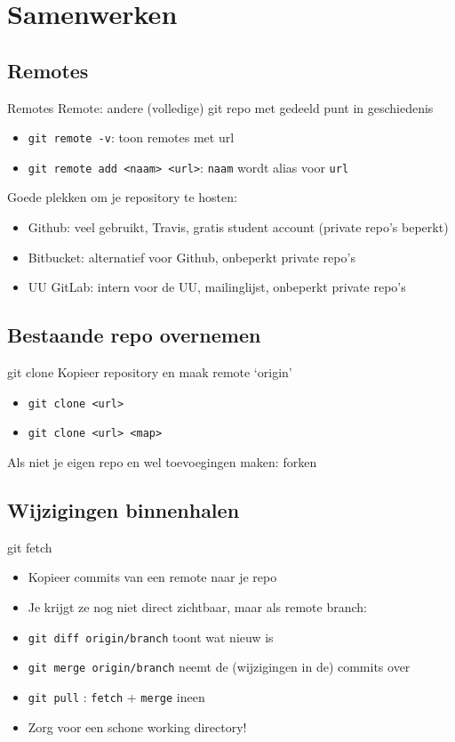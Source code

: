 \section{Samenwerken}

\subsection{Remotes}
\begin{frame}{Remotes}
	Remote: andere (volledige) git repo met gedeeld punt in geschiedenis
	\begin{itemize}
		\item \texttt{git remote -v}: toon remotes met url
		\item \texttt{git remote add <naam> <url>}: \texttt{naam} wordt alias voor \texttt{url}
	\end{itemize}
	Goede plekken om je repository te hosten:
	\begin{itemize}
		\item Github: veel gebruikt, Travis, gratis student account (private repo's beperkt)
		\item Bitbucket: alternatief voor Github, onbeperkt private repo's
		\item UU GitLab: intern voor de UU, mailinglijst, onbeperkt private repo's
	\end{itemize}
\end{frame}

\subsection{Bestaande repo overnemen}
\begin{frame}{git clone}
	Kopieer repository en maak remote `origin'
	\begin{itemize}
		\item \texttt{git clone <url>}
		\item \texttt{git clone <url> <map>}
	\end{itemize}
	Als niet je eigen repo en wel toevoegingen maken: forken
\end{frame}

\subsection{Wijzigingen binnenhalen}
\begin{frame}{git fetch}
	\begin{itemize}
		\item Kopieer commits van een remote naar je repo
		\item Je krijgt ze nog niet direct zichtbaar, maar als remote branch:
		\item \texttt{git diff origin/branch} toont wat nieuw is
		\item \texttt{git merge origin/branch} neemt de (wijzigingen in de) commits over
		\item \texttt{git pull} : \texttt{fetch} + \texttt{merge} ineen
		\item Zorg voor een schone working directory!
	\end{itemize}
\end{frame}

